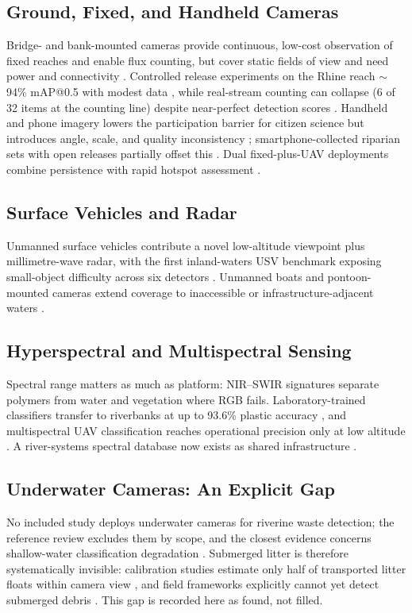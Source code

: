 \subsection{Ground, Fixed, and Handheld Cameras}
Bridge- and bank-mounted cameras provide continuous, low-cost observation of fixed reaches and enable flux counting, but cover static fields of view and need power and connectivity \cite{Lieshout2020,Reinhardt2024}. Controlled release experiments on the Rhine reach $\sim$94\% mAP@0.5 with modest data \cite{Reinhardt2024}, while real-stream counting can collapse (6 of 32 items at the counting line) despite near-perfect detection scores \cite{Lee2025}. Handheld and phone imagery lowers the participation barrier for citizen science but introduces angle, scale, and quality inconsistency \cite{JiaFrontiers2023,Tharani2021}; smartphone-collected riparian sets with open releases partially offset this \cite{Pan2024}. Dual fixed-plus-UAV deployments combine persistence with rapid hotspot assessment \cite{FrontEnv2025}.

\subsection{Surface Vehicles and Radar}
Unmanned surface vehicles contribute a novel low-altitude viewpoint plus millimetre-wave radar, with the first inland-waters USV benchmark exposing small-object difficulty across six detectors \cite{Cheng2021}. Unmanned boats and pontoon-mounted cameras extend coverage to inaccessible or infrastructure-adjacent waters \cite{Peng2024,FrontEnv2025}.

\subsection{Hyperspectral and Multispectral Sensing}
Spectral range matters as much as platform: NIR--SWIR signatures separate polymers from water and vegetation where RGB fails. Laboratory-trained classifiers transfer to riverbanks at up to 93.6\% plastic accuracy \cite{Tasseron2022}, and multispectral UAV classification reaches operational precision only at low altitude \cite{Cortesi2022}. A river-systems spectral database now exists as shared infrastructure \cite{Olyaei2024}.

\subsection{Underwater Cameras: An Explicit Gap}
No included study deploys underwater cameras for riverine waste detection; the reference review excludes them by scope, and the closest evidence concerns shallow-water classification degradation \cite{Jakovljevic2020}. Submerged litter is therefore systematically invisible: calibration studies estimate only half of transported litter floats within camera view \cite{Wolf2022}, and field frameworks explicitly cannot yet detect submerged debris \cite{Nunkhaw2025}. This gap is recorded here as found, not filled.

